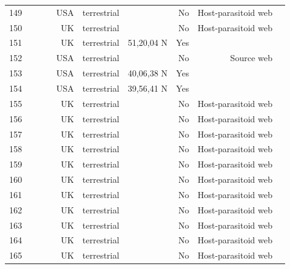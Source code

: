 \documentclass[12pt]{article}
\begin{document}
\begin{landscape}
\begin{table}[h!]
\begin{tabular}{rrrrrrrrr}
      149   & ~\citet{GlobalWeb} & ~\citet{Force1974} & USA   & terrestrial &       & No    & Host-parasitoid web &  \\
      150   & ~\citet{GlobalWeb} & ~\citet{Hopkins1984} & UK    & terrestrial &       & No    & Host-parasitoid web &  \\
      151   & ~\citet{GlobalWeb} & ~\citet{Richards1926} & UK    & terrestrial & 51,20,04 N & Yes   &       &  \\
      152   & ~\citet{GlobalWeb} & ~\citet{Whittaker1984} & USA   & terrestrial &       & No    & Source web &  \\
      153   & ~\citet{GlobalWeb} & ~\citet{Mayse1978} & USA   & terrestrial & 40,06,38 N & Yes   &       &  \\
      154   & ~\citet{GlobalWeb} & ~\citet{Mayse1978} & USA   & terrestrial & 39,56,41 N & Yes   &       &  \\
      155   & ~\citet{GlobalWeb} & ~\citet{Askew1975} & UK    & terrestrial &       & No    & Host-parasitoid web &  \\
      156   & ~\citet{GlobalWeb} & ~\citet{Askew1961} & UK    & terrestrial &       & No    & Host-parasitoid web &  \\
      157   & ~\citet{GlobalWeb} & ~\citet{Askew1961} & UK    & terrestrial &       & No    & Host-parasitoid web &  \\
      158   & ~\citet{GlobalWeb} & ~\citet{Askew1961} & UK    & terrestrial &       & No    & Host-parasitoid web &  \\
      159   & ~\citet{GlobalWeb} & ~\citet{Askew1961} & UK    & terrestrial &       & No    & Host-parasitoid web &  \\
      160   & ~\citet{GlobalWeb} & ~\citet{Askew1961} & UK    & terrestrial &       & No    & Host-parasitoid web &  \\
      161   & ~\citet{GlobalWeb} & ~\citet{Askew1961} & UK    & terrestrial &       & No    & Host-parasitoid web &  \\
      162   & ~\citet{GlobalWeb} & ~\citet{Askew1961} & UK    & terrestrial &       & No    & Host-parasitoid web &  \\
      163   & ~\citet{GlobalWeb} & ~\citet{Askew1961} & UK    & terrestrial &       & No    & Host-parasitoid web &  \\
      164   & ~\citet{GlobalWeb} & ~\citet{Askew1961} & UK    & terrestrial &       & No    & Host-parasitoid web &  \\
      165   & ~\citet{GlobalWeb} & ~\citet{Askew1961} & UK    & terrestrial &       & No    & Host-parasitoid web &  \\

\end{tabular}
\end{table}
\end{landscape}
\end{document}
